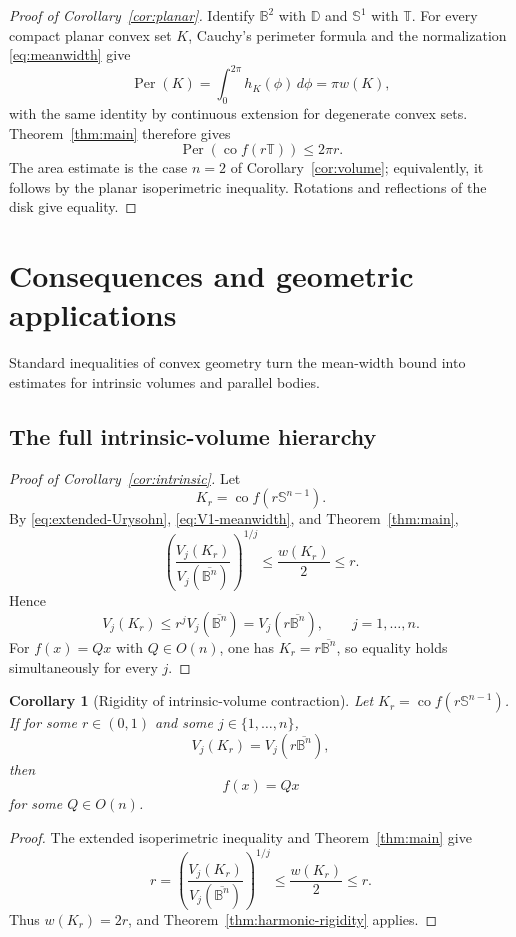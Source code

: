 \documentclass[11pt,reqno]{amsart}
\newtheorem{corollary}[theorem]{Corollary}
\theoremstyle{remark}
\begin{document}
\begin{proof}[Proof of Corollary~\ref{cor:planar}]
Identify $\mathbb B^2$ with $\mathbb D$ and $\mathbb S^1$ with
$\mathbb T$.  For every compact planar convex set $K$, Cauchy's perimeter
formula and the normalization \eqref{eq:meanwidth} give
\[
 \operatorname{Per}(K)
 =
 \int_0^{2\pi}h_K(\phi)\,d\phi
 =
 \pi w(K),
\]
with the same identity by continuous extension for degenerate convex sets.
Theorem~\ref{thm:main} therefore gives
\[
 \operatorname{Per}\!\left(\operatorname{co}f(r\mathbb T)\right)
 \le2\pi r.
\]
The area estimate is the case $n=2$ of
Corollary~\ref{cor:volume}; equivalently, it follows by the planar
isoperimetric inequality.  Rotations and reflections of the disk give
equality.
\end{proof}


\section{Consequences and geometric applications}

Standard inequalities of convex geometry turn the mean-width bound into
estimates for intrinsic volumes and parallel bodies.

\subsection{The full intrinsic-volume hierarchy}

\begin{proof}[Proof of Corollary~\ref{cor:intrinsic}]
Let
\[
 K_r=\operatorname{co}f(r\mathbb S^{n-1}).
\]
By \eqref{eq:extended-Urysohn}, \eqref{eq:V1-meanwidth}, and
Theorem~\ref{thm:main},
\[
 \left(
 \frac{V_j(K_r)}{V_j(\overline{\mathbb B^n})}
 \right)^{1/j}
 \le
 \frac{w(K_r)}2
 \le r.
\]
Hence
\[
 V_j(K_r)
 \le
 r^jV_j(\overline{\mathbb B^n})
 =
 V_j(r\overline{\mathbb B^n}),
 \qquad j=1,\ldots,n.
\]
For $f(x)=Qx$ with $Q\in O(n)$, one has
$K_r=r\overline{\mathbb B^n}$, so equality holds simultaneously for every
$j$.
\end{proof}

\begin{corollary}[Rigidity of intrinsic-volume contraction]
\label{cor:intrinsic-rigidity}
Let $K_r=\operatorname{co}f(r\mathbb S^{n-1})$.  If for some
$r\in(0,1)$ and some $j\in\{1,\ldots,n\}$,
\[
 V_j(K_r)=V_j(r\overline{\mathbb B^n}),
\]
then
\[
 f(x)=Qx
\]
for some $Q\in O(n)$.
\end{corollary}

\begin{proof}
The extended isoperimetric inequality and
Theorem~\ref{thm:main} give
\[
 r
 =
 \left(
 \frac{V_j(K_r)}
 {V_j(\overline{\mathbb B^n})}
 \right)^{1/j}
 \le
 \frac{w(K_r)}2
 \le r.
\]
Thus $w(K_r)=2r$, and Theorem~\ref{thm:harmonic-rigidity} applies.
\end{proof}
\end{document}
